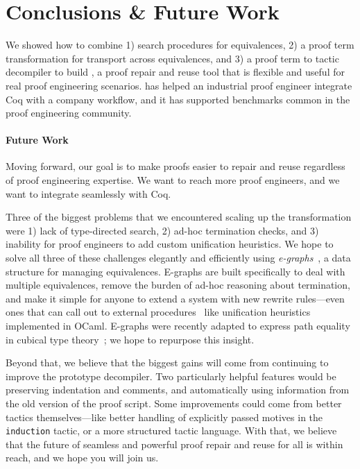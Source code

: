 \section{Conclusions \& Future Work}
\label{sec:discussion}

We showed how to combine 1) search procedures for equivalences, 2) a proof term transformation for transport across equivalences,
and 3) a proof term to tactic decompiler to build \toolname,
a proof repair and reuse tool that is flexible and useful for real proof engineering scenarios.
\toolname has helped an industrial proof engineer integrate Coq with a company workflow,
and it has supported benchmarks common in the proof engineering community.


\paragraph{Future Work}

Moving forward, our goal is to make proofs easier to repair and reuse regardless of proof engineering expertise.
We want to reach more proof engineers, and we want \toolname to integrate seamlessly with Coq.

Three of the biggest problems that we encountered scaling up the \toolname transformation were 1) lack of type-directed search,
2) ad-hoc termination checks, and 3) inability for proof engineers to add custom unification heuristics.
We hope to solve all three of these challenges elegantly and efficiently using \textit{e-graphs}~\cite{egraph1},
a data structure %
for managing equivalences.
E-graphs are built specifically to deal with multiple equivalences,
remove the burden of ad-hoc reasoning about termination,
and make it simple for anyone to extend a system with new
rewrite rules---even ones that can call out to external procedures~\cite{egraph5} 
like unification heuristics implemented in OCaml.
E-graphs were recently adapted to express path equality in cubical type theory~\cite{egraph6}; we hope to repurpose this insight.

Beyond that, we believe that the biggest gains will come from continuing to improve the prototype decompiler.
Two particularly helpful features would be preserving indentation and comments, and automatically using information from the old 
version of the proof script.
Some improvements could come from better tactics themselves---like better handling of explicitly passed 
motives in the \lstinline{induction} tactic, or a more structured tactic language.
With that, we believe that the future of seamless and powerful proof repair and reuse for all is within reach,
and we hope you will join us.



